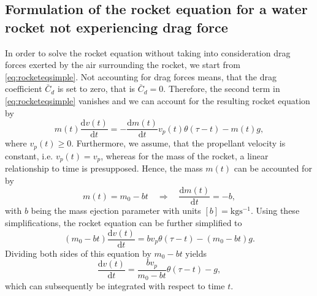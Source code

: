 \documentclass[a4paper,11pt]{report}
\begin{document}
\subsection{Formulation of the rocket equation for a water rocket not experiencing drag force}
In order to solve the rocket equation without taking into consideration drag forces exerted by the air surrounding the rocket, we start from \cref{eq:rocketeqsimple}. Not accounting for drag forces means, that the drag coefficient $\bar{C}_d$ is set to zero, that is $\bar{C}_d = 0$. Therefore, the second term in \cref{eq:rocketeqsimple} vanishes and we can account for the resulting rocket equation by \begin{equation}
m(t)\frac{\mathrm{d}v(t)}{\mathrm{d}t} = -\frac{\mathrm{d}m(t)}{\mathrm{d}t}v_p(t)\theta(\tau-t) - m(t) g,
\end{equation} where $v_p(t) \geq 0$. Furthermore, we assume, that the propellant velocity is constant, i.e. $v_p(t) = v_p$, whereas for the mass of the rocket, a linear relationship to time is presupposed. Hence, the mass $m(t)$ can be accounted for by \begin{equation}
m(t) = m_0 - bt \quad \Rightarrow \quad \frac{\mathrm{d}m(t)}{\mathrm{d}t} = -b,
\end{equation} with $b$ being the mass ejection parameter with units $[b] = \si{\kilo\gram\second^{-1}}$. Using these simplifications, the rocket equation can be further simplified to \begin{equation}
(m_0-bt)\frac{\mathrm{d}v(t)}{\mathrm{d}t} = bv_p\theta(\tau-t) - (m_0-bt) g.
\end{equation} Dividing both sides of this equation by $m_0-bt$ yields \begin{equation}\label{eq:rocketeqwithoutdragtointegrate}
\frac{\mathrm{d}v(t)}{\mathrm{d}t} = \frac{bv_p}{m_0-bt}\theta(\tau-t)-g,
\end{equation} which can subsequently be integrated with respect to time $t$.
\end{document}
